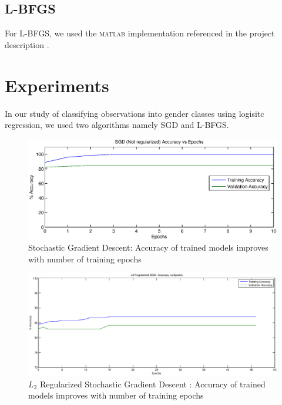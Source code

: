 \documentclass{acm_proc_article-sp}
\begin{document}
\subsection{L-BFGS}
For L-BFGS, we used the \textsc{matlab} implementation referenced in the project description \cite{lbfgsMatlabImpl}.

\section{Experiments}
In our study of classifying observations into gender classes using logisitc regression, we used two algorithms namely SGD and L-BFGS.

\begin{figure}\label{SGD_(not_Regularized)_Accuracy_vs_Epochs}
\centering
\includegraphics[scale=0.4]{SGD_(not_Regularized)_Accuracy_vs_Epochs.eps}
\caption{Stochastic Gradient Descent: Accuracy of trained models improves with number of training epochs}
\end{figure}

\begin{figure}\label{accuracy_vs_epochs_l2_regularized}
\centering
\includegraphics[scale=0.25]{accuracy_vs_epochs_l2_regularized.eps}
\caption{$L_{2}$ Regularized Stochastic Gradient Descent : Accuracy of trained models improves with number of training epochs}
\end{figure}
\end{document}
